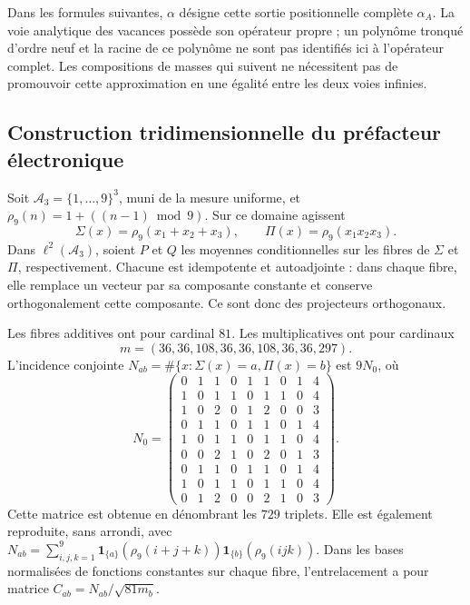 Dans les formules suivantes, \(\alpha\) désigne cette sortie positionnelle
complète \(\alpha_A\). La voie analytique des vacances possède son opérateur
propre ; un polynôme tronqué d’ordre neuf et la racine de ce polynôme
ne sont pas identifiés ici à l’opérateur complet. Les compositions de
masses qui suivent ne nécessitent pas de promouvoir cette approximation en
une égalité entre les deux voies infinies.

\subsection{Construction tridimensionnelle du préfacteur électronique}
\label{vi:vi:dep:prefactor}

Soit \(\mathcal A_3=\{1,\ldots,9\}^3\), muni de la mesure uniforme, et
\(\rho_9(n)=1+((n-1)\bmod9)\). Sur ce domaine agissent
\[
 \Sigma(x)=\rho_9(x_1+x_2+x_3),\qquad
 \Pi(x)=\rho_9(x_1x_2x_3).
\]
Dans \(\ell^2(\mathcal A_3)\), soient \(P\) et \(Q\) les moyennes
conditionnelles sur les fibres de \(\Sigma\) et \(\Pi\),
respectivement. Chacune est idempotente et autoadjointe : dans chaque
fibre, elle remplace un vecteur par sa composante constante et conserve
orthogonalement cette composante. Ce sont donc des projecteurs orthogonaux.

Les fibres additives ont pour cardinal \(81\). Les multiplicatives ont
pour cardinaux
\[
m=(36,36,108,36,36,108,36,36,297).
\]
L’incidence conjointe
\(N_{ab}=\#\{x:\Sigma(x)=a,\Pi(x)=b\}\) est \(9N_0\), où
\begin{equation}
 N_0=\begin{pmatrix}
0&1&1&0&1&1&0&1&4\\1&0&1&1&0&1&1&0&4\\
1&0&2&0&1&2&0&0&3\\0&1&1&0&1&1&0&1&4\\
1&0&1&1&0&1&1&0&4\\0&0&2&1&0&2&0&1&3\\
0&1&1&0&1&1&0&1&4\\1&0&1&1&0&1&1&0&4\\
0&1&2&0&0&2&1&0&3
\end{pmatrix}.
 \label{vi:vi:dep:incidencia-cubica}
\end{equation}
Cette matrice est obtenue en dénombrant les \(729\) triplets. Elle est également
reproduite, sans arrondi, avec
\(N_{ab}=\sum_{i,j,k=1}^9
\mathbf1_{\{a\}}(\rho_9(i+j+k))
\mathbf1_{\{b\}}(\rho_9(ijk))\).
Dans les bases normalisées de fonctions constantes sur chaque fibre,
l’entrelacement a pour matrice \(C_{ab}=N_{ab}/\sqrt{81m_b}\).

